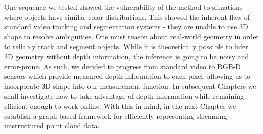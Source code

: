 One sequence we tested showed the vulnerability of the method to situations where objects have similar color distributions. This showed the inherent flaw of standard video tracking and segmentation systems - they are unable to use 3D shape to resolve ambiguities. One must reason about real-world geometry in order to reliably track and segment objects. While it is theoretically possible to infer 3D geometry without depth information, the inference is going to be noisy and error-prone. As such, we decided to progress from standard video to RGB-D sensors which provide measured depth information to each pixel, allowing us to incorporate 3D shape into our measurement function. In subsequent Chapters we shall investigate how to take advantage of depth information while remaining efficient enough to work online. With this in mind, in the next Chapter we establish a graph-based framework for efficiently representing streaming unstructured point cloud data. 


